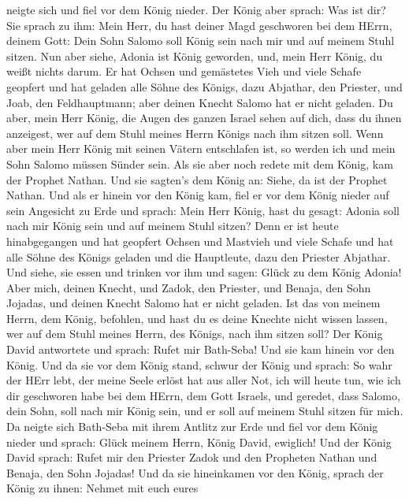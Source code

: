 neigte sich und fiel vor dem König nieder. Der König aber sprach: Was
ist dir?  Sie sprach zu ihm: Mein Herr, du hast deiner Magd
geschworen bei dem HErrn, deinem Gott: Dein Sohn Salomo soll König sein
nach mir und auf meinem Stuhl sitzen.  Nun aber siehe,
Adonia ist König geworden, und, mein Herr König, du weißt nichts darum.
 Er hat Ochsen und gemästetes Vieh und viele Schafe
geopfert und hat geladen alle Söhne des Königs, dazu Abjathar, den
Priester, und Joab, den Feldhauptmann; aber deinen Knecht Salomo hat er
nicht geladen.  Du aber, mein Herr König, die Augen des
ganzen Israel sehen auf dich, dass du ihnen anzeigest, wer auf dem Stuhl
meines Herrn Königs nach ihm sitzen soll.  Wenn aber mein
Herr König mit seinen Vätern entschlafen ist, so werden ich und mein
Sohn Salomo müssen Sünder sein.  Als sie aber noch redete
mit dem König, kam der Prophet Nathan.  Und sie sagten's
dem König an: Siehe, da ist der Prophet Nathan. Und als er hinein vor
den König kam, fiel er vor dem König nieder auf sein Angesicht zu Erde
 und sprach: Mein Herr König, hast du gesagt: Adonia soll
nach mir König sein und auf meinem Stuhl sitzen?  Denn er
ist heute hinabgegangen und hat geopfert Ochsen und Mastvieh und viele
Schafe und hat alle Söhne des Königs geladen und die Hauptleute, dazu
den Priester Abjathar. Und siehe, sie essen und trinken vor ihm und
sagen: Glück zu dem König Adonia!  Aber mich, deinen
Knecht, und Zadok, den Priester, und Benaja, den Sohn Jojadas, und
deinen Knecht Salomo hat er nicht geladen.  Ist das von
meinem Herrn, dem König, befohlen, und hast du es deine Knechte nicht
wissen lassen, wer auf dem Stuhl meines Herrn, des Königs, nach ihm
sitzen soll?  Der König David antwortete und sprach: Rufet
mir Bath-Seba! Und sie kam hinein vor den König. Und da sie vor dem
König stand,  schwur der König und sprach: So wahr der HErr
lebt, der meine Seele erlöst hat aus aller Not,  ich will
heute tun, wie ich dir geschworen habe bei dem HErrn, dem Gott Israels,
und geredet, dass Salomo, dein Sohn, soll nach mir König sein, und er
soll auf meinem Stuhl sitzen für mich.  Da neigte sich
Bath-Seba mit ihrem Antlitz zur Erde und fiel vor dem König nieder und
sprach: Glück meinem Herrn, König David, ewiglich!  Und der
König David sprach: Rufet mir den Priester Zadok und den Propheten
Nathan und Benaja, den Sohn Jojadas! Und da sie hineinkamen vor den
König,  sprach der König zu ihnen: Nehmet mit euch eures
